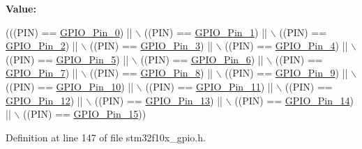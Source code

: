 {\bfseries Value\+:}
\begin{DoxyCode}
(((PIN) == \hyperlink{group___g_p_i_o__pins__define_gab305b8d1be9f89bf2b4a05589b456049}{GPIO\_Pin\_0}) || \(\backslash\)
                              ((PIN) == \hyperlink{group___g_p_i_o__pins__define_ga29db642c26f1fa0fffc3ecadcd30f82b}{GPIO\_Pin\_1}) || \(\backslash\)
                              ((PIN) == \hyperlink{group___g_p_i_o__pins__define_gabdf6630324b2f99360537a310687187c}{GPIO\_Pin\_2}) || \(\backslash\)
                              ((PIN) == \hyperlink{group___g_p_i_o__pins__define_ga763c6544859dbe28cd3f8ad820045556}{GPIO\_Pin\_3}) || \(\backslash\)
                              ((PIN) == \hyperlink{group___g_p_i_o__pins__define_gacbf04d09b954606cdcc55eb2e81780e3}{GPIO\_Pin\_4}) || \(\backslash\)
                              ((PIN) == \hyperlink{group___g_p_i_o__pins__define_ga32dbe930f52ce5ab60190c65e9dc741e}{GPIO\_Pin\_5}) || \(\backslash\)
                              ((PIN) == \hyperlink{group___g_p_i_o__pins__define_gaf047899d873f27c2db9f50b342e35a58}{GPIO\_Pin\_6}) || \(\backslash\)
                              ((PIN) == \hyperlink{group___g_p_i_o__pins__define_ga7346b6ce5507bd28a7a79e7dcc816c08}{GPIO\_Pin\_7}) || \(\backslash\)
                              ((PIN) == \hyperlink{group___g_p_i_o__pins__define_gac891f0984dc64af3567577fbf13ab304}{GPIO\_Pin\_8}) || \(\backslash\)
                              ((PIN) == \hyperlink{group___g_p_i_o__pins__define_gaad1891082d5d6bcac06c2729a9fdd2f0}{GPIO\_Pin\_9}) || \(\backslash\)
                              ((PIN) == \hyperlink{group___g_p_i_o__pins__define_ga726af6407ba60ac60f02057227c2d348}{GPIO\_Pin\_10}) || \(\backslash\)
                              ((PIN) == \hyperlink{group___g_p_i_o__pins__define_ga5139d5bc3d15784ae7794ed2ae1ff767}{GPIO\_Pin\_11}) || \(\backslash\)
                              ((PIN) == \hyperlink{group___g_p_i_o__pins__define_gada91257dcaab2c86f75fbd8e4b52b98c}{GPIO\_Pin\_12}) || \(\backslash\)
                              ((PIN) == \hyperlink{group___g_p_i_o__pins__define_ga4155a41c433f3657b9c79cfbd4240966}{GPIO\_Pin\_13}) || \(\backslash\)
                              ((PIN) == \hyperlink{group___g_p_i_o__pins__define_ga21cd1d89c0c061a6f09c5a842610bee5}{GPIO\_Pin\_14}) || \(\backslash\)
                              ((PIN) == \hyperlink{group___g_p_i_o__pins__define_gae686a9fc47cf3e420e5db0784210711d}{GPIO\_Pin\_15}))
\end{DoxyCode}


Definition at line 147 of file stm32f10x\+\_\+gpio.\+h.

